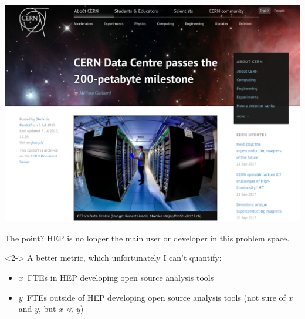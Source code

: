 \documentclass[aspectratio=169]{beamer}
\begin{document}
\begin{frame}{}
\vspace{0.35 cm}
\includegraphics[width=0.73\linewidth]{cern-200pb.png}

\vspace{-4.8 cm}
\end{frame}

\begin{frame}{The point?}
\Large
\vspace{0.5 cm}
HEP is no longer the main user or developer in this problem space.

\vspace{0.5 cm}
\begin{uncoverenv}<2->
A better metric, which unfortunately I can't quantify:
\begin{itemize}
\item $x$~FTEs in HEP developing open source analysis tools
\item $y$~FTEs outside of HEP developing open source analysis tools
(not sure of $x$ and $y$, but $x \ll y$)
\end{itemize}
\end{uncoverenv}

\vspace{0.5 cm}



\mbox{ }
\end{frame}
\end{document}
